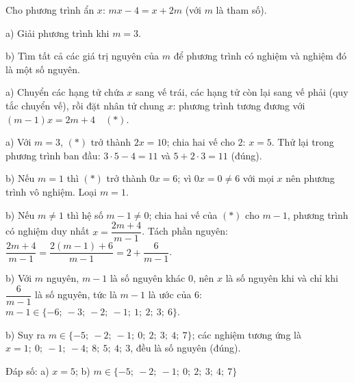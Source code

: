 \begin{problem}[8DS-PT1-029]
Cho phương trình ẩn $x$: $mx - 4 = x + 2m$ (với $m$ là tham số).

a) Giải phương trình khi $m = 3$.

b) Tìm tất cả các giá trị nguyên của $m$ để phương trình có nghiệm và nghiệm đó là một số nguyên.

\begin{solution}
a) Chuyển các hạng tử chứa $x$ sang vế trái, các hạng tử còn lại sang vế phải (quy tắc chuyển vế), rồi đặt nhân tử chung $x$: phương trình tương đương với $(m - 1)x = 2m + 4 \quad (*)$.

a) Với $m = 3$, $(*)$ trở thành $2x = 10$; chia hai vế cho $2$: $x = 5$. Thử lại trong phương trình ban đầu: $3 \cdot 5 - 4 = 11$ và $5 + 2 \cdot 3 = 11$ (đúng).

b) Nếu $m = 1$ thì $(*)$ trở thành $0x = 6$; vì $0x = 0 \neq 6$ với mọi $x$ nên phương trình vô nghiệm. Loại $m = 1$.

b) Nếu $m \neq 1$ thì hệ số $m - 1 \neq 0$; chia hai vế của $(*)$ cho $m - 1$, phương trình có nghiệm duy nhất $x = \dfrac{2m + 4}{m - 1}$. Tách phần nguyên: $\dfrac{2m + 4}{m - 1} = \dfrac{2(m - 1) + 6}{m - 1} = 2 + \dfrac{6}{m - 1}$.

b) Với $m$ nguyên, $m - 1$ là số nguyên khác $0$, nên $x$ là số nguyên khi và chỉ khi $\dfrac{6}{m - 1}$ là số nguyên, tức là $m - 1$ là ước của $6$: $m - 1 \in \{-6;\ -3;\ -2;\ -1;\ 1;\ 2;\ 3;\ 6\}$.

b) Suy ra $m \in \{-5;\ -2;\ -1;\ 0;\ 2;\ 3;\ 4;\ 7\}$; các nghiệm tương ứng là $x = 1;\ 0;\ -1;\ -4;\ 8;\ 5;\ 4;\ 3$, đều là số nguyên (đúng).

Đáp số: a) $\boxed{x = 5}$; b) $\boxed{m \in \{-5;\ -2;\ -1;\ 0;\ 2;\ 3;\ 4;\ 7\}}$
\end{solution}
\end{problem}

